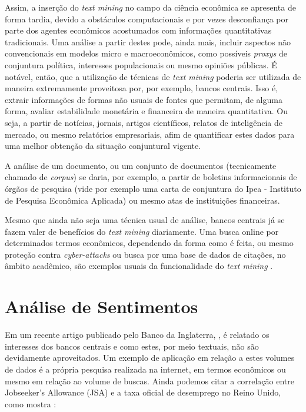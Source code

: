 Assim, a inserção do \textit{text mining} no campo da ciência econômica se apresenta de forma tardia, devido a obstáculos computacionais e por vezes desconfiança por parte dos agentes econômicos acostumados com informações quantitativas tradicionais. Uma análise a partir destes pode, ainda mais, incluir aspectos não convencionais em modelos micro e macroeconômicos, como possíveis \textit{proxys} de conjuntura política, interesses populacionais ou mesmo opiniões públicas. É notável, então, que a utilização de técnicas de \textit{text mining} poderia ser utilizada de maneira extremamente proveitosa por, por exemplo, bancos centrais. Isso é, extrair informações de formas não usuais de fontes que permitam, de alguma forma, avaliar estabilidade monetária e financeira de maneira quantitativa. Ou seja, a partir de notícias, jornais, artigos científicos, relatos de inteligência de mercado, ou mesmo relatórios empresariais, afim de quantificar estes dados para uma melhor obtenção da situação conjuntural vigente. 

A análise de um documento, ou um conjunto de documentos (tecnicamente chamado de \textit{corpus}) se daria, por exemplo, a partir de boletins informacionais de órgãos de pesquisa (vide por exemplo uma carta de conjuntura do Ipea - Instituto de Pesquisa Econômica Aplicada) ou mesmo atas de instituições financeiras.

Mesmo que ainda não seja uma técnica usual de análise, bancos centrais já se fazem valer de benefícios do \textit{text mining} diariamente. Uma busca online por determinados termos econômicos, dependendo da forma como é feita, ou mesmo proteção contra \textit{cyber-attacks} ou busca por uma base de dados de citações, no âmbito acadêmico, são exemplos usuais da funcionalidade do \textit{text mining} \cite{bholat2015text}.

\section{Análise de Sentimentos}

Em um recente artigo publicado pelo Banco da Inglaterra, ,  é relatado os interesses dos bancos centrais e como estes, por meio textuais, não são devidamente aproveitados. Um exemplo de aplicação em relação a estes volumes de dados é a própria pesquisa realizada na internet, em termos econômicos ou mesmo em relação ao volume de buscas. Ainda podemos citar a correlação entre Jobseeker’s Allowance (JSA) e a taxa oficial de desemprego no Reino Unido, como mostra :

